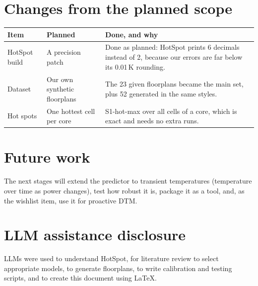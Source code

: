 \documentclass[11pt,a4paper]{article}
\begin{document}
\section{Changes from the planned scope}
\begin{center}
\small
\begin{tabular}{@{}p{3cm} p{4.4cm} p{7.6cm}@{}}
\toprule
Item & Planned & Done, and why \\
\midrule
HotSpot build & A precision patch & Done as planned: HotSpot prints 6 decimals instead of 2, because our errors are far below its 0.01\,K rounding. \\
Dataset & Our own synthetic floorplans & The 23 given floorplans became the main set, plus 52 generated in the same styles. \\
Hot spots & One hottest cell per core & S1-hot-max over all cells of a core, which is exact and needs no extra runs. \\
\bottomrule
\end{tabular}
\end{center}

\section{Future work}
The next stages will extend the predictor to transient temperatures (temperature over time as
power changes), test how robust it is, package it as a tool, and, as the wishlist item, use it for
proactive DTM.

\section{LLM assistance disclosure}
LLMs were used to understand HotSpot, for literature review to select appropriate models, to
generate floorplans, to write calibration and testing scripts, and to create this document
using \LaTeX.
\end{document}

